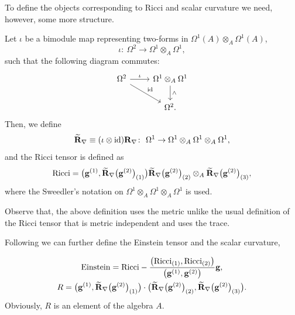 \documentclass[pdftex]{sigma}
\numberwithin{equation}{section}
\begin{document}
To define the objects corresponding to Ricci and scalar curvature we need, however, some more structure.
\begin{Definition}
Let $\iota$ be a bimodule map representing two-forms in $\Omega^1(A) \otimes_A \Omega^1(A)$,
\begin{equation*}
\iota\colon \ \Omega^2\rightarrow \Omega^1\otimes_A\Omega^1,
\end{equation*}
such that the following diagram commutes:
\[
\begin{tikzcd}\Omega^2\arrow[dr,"\mathrm{id}"]\arrow[r,"\iota"]& \Omega^1\otimes_A\Omega^1\arrow[d,"\wedge"] \\ &\Omega^2.
\end{tikzcd}
\]
Then, we define
\begin{equation*}
\widetilde{{\bf R}}_\nabla\equiv(\iota\otimes \mathrm{id}){\bf R}_\nabla \colon \ \Omega^1\rightarrow\Omega^1\otimes_A\Omega^1\otimes_A\Omega^1,
\end{equation*}
and the Ricci tensor is defined as
\begin{equation*}
{\rm Ricci}=\big({\bf g}^{(1)},\widetilde{{\bf R}}_\nabla\big({\bf g}^{(2)}\big)_{(1)}\big)\widetilde{{\bf R}}_\nabla\big({\bf g}^{(2)}\big)_{(2)}\otimes_A \widetilde{{\bf R}}_\nabla\big({\bf g}^{(2)}\big)_{(3)},
\end{equation*}
where the Sweedler's notation on $\Omega^1\otimes_A\Omega^1\otimes_A\Omega^1$ is used.
\end{Definition}

Observe that, the above definition uses the metric unlike the usual definition of the Ricci tensor
that is metric independent and uses the trace.

Following \cite{BM14} we can further define the Einstein tensor and the scalar curvature,
\begin{Definition}
\begin{gather*}
{\rm Einstein}={\rm Ricci}-\frac{\big(\mathrm{Ricci}_{(1)},\mathrm{Ricci}_{(2)}\big)}{\big({\bf g}^{(1)},{\bf g}^{(2)}\big)}{\bf g},\\
R=\big({\bf g}^{(1)},\widetilde{{\bf R}}_\nabla\big({\bf g}^{(2)}\big)_{(1)}\big)
\cdot\big(\widetilde{{\bf R}}_\nabla\big({\bf g}^{(2)}\big)_{(2)}, \widetilde{{\bf R}}_\nabla\big({\bf g}^{(2)}\big)_{(3)}\big).
\end{gather*}
Obviously, $R$ is an element of the algebra $A$.
\end{Definition}
\end{document}
